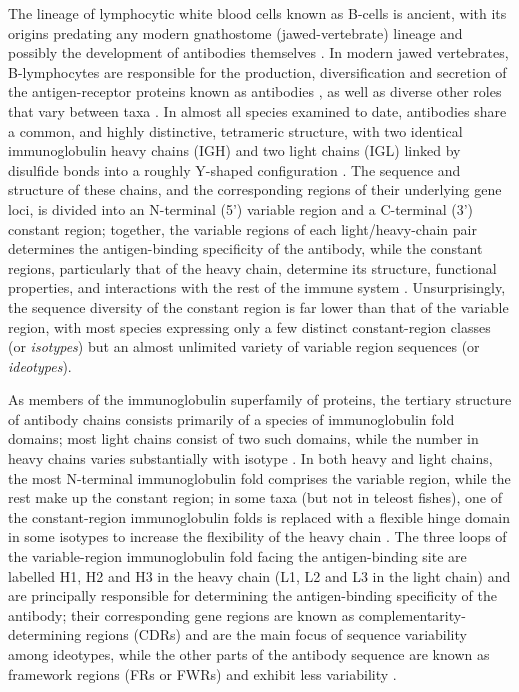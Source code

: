The lineage of lymphocytic white blood cells known as B-cells is ancient, with its origins predating any modern gnathostome (jawed-vertebrate) lineage and possibly the development of antibodies themselves \parencite{boehm2011design,kasahara2015vlr}. In modern jawed vertebrates, B-lymphocytes are responsible for the production, diversification and secretion of the antigen-receptor proteins known as antibodies \parencite{schroeder2010immunoglobulins}, as well as diverse other roles that vary between taxa \parencite{sunyer2013fishing}. In almost all species examined to date, antibodies share a common, and highly distinctive, tetrameric structure, with two identical immunoglobulin heavy chains (IGH) and two light chains (IGL) linked by disulfide bonds into a roughly Y-shaped configuration \parencite{schroeder2010immunoglobulins}. The sequence and structure of these chains, and the corresponding regions of their underlying gene loci, is divided into an N-terminal (5') variable region and a C-terminal (3') constant region; together, the variable regions of each light/heavy-chain pair determines the antigen-binding specificity of the antibody, while the constant regions, particularly that of the heavy chain, determine its structure, functional properties, and interactions with the rest of the immune system \parencite{schroeder2010immunoglobulins}. Unsurprisingly, the sequence diversity of the constant region is far lower than that of the variable region, with most species expressing only a few distinct constant-region classes (or \textit{isotypes}) but an almost unlimited variety of variable region sequences (or \textit{ideotypes}).

As members of the immunoglobulin superfamily of proteins, the tertiary structure of antibody chains consists primarily of a species of immunoglobulin fold domains; most light chains consist of two such domains, while the number in heavy chains varies substantially with isotype \parencite{schroeder2010immunoglobulins}. In both heavy and light chains, the most N-terminal immunoglobulin fold comprises the variable region, while the rest make up the constant region; in some taxa (but not in teleost fishes), one of the constant-region immunoglobulin folds is replaced with a flexible hinge domain in some isotypes to increase the flexibility of the heavy chain \parencite{schroeder2010immunoglobulins}. The three loops of the variable-region immunoglobulin fold facing the antigen-binding site are labelled H1, H2 and H3 in the heavy chain (L1, L2 and L3 in the light chain) and are principally responsible for determining the antigen-binding specificity of the antibody; their corresponding gene regions are known as complementarity-determining regions (CDRs) and are the main focus of sequence variability among ideotypes, while the other parts of the antibody sequence are known as framework regions (FRs or FWRs) and exhibit less variability \parencite{schroeder2010immunoglobulins}.

